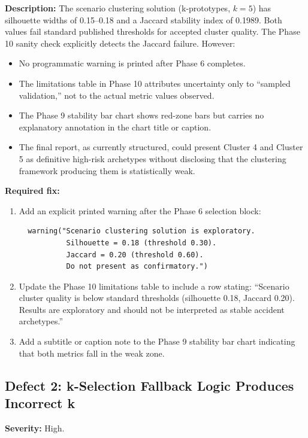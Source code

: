 \documentclass[11pt]{article}
\begin{document}
\textbf{Description:} The scenario clustering solution (k-prototypes, $k=5$)
has silhouette widths of 0.15--0.18 and a Jaccard stability index of 0.1989.
Both values fail standard published thresholds for accepted cluster quality.
The Phase 10 sanity check explicitly detects the Jaccard failure. However:

\begin{itemize}
\item No programmatic warning is printed after Phase 6 completes.
\item The limitations table in Phase 10 attributes uncertainty only to ``sampled
  validation,'' not to the actual metric values observed.
\item The Phase 9 stability bar chart shows red-zone bars but carries no
  explanatory annotation in the chart title or caption.
\item The final report, as currently structured, could present Cluster 4 and
  Cluster 5 as definitive high-risk archetypes without disclosing that the
  clustering framework producing them is statistically weak.
\end{itemize}

\textbf{Required fix:}
\begin{enumerate}
\item Add an explicit printed warning after the Phase 6 selection block:
  \begin{verbatim}
  warning("Scenario clustering solution is exploratory.
           Silhouette = 0.18 (threshold 0.30).
           Jaccard = 0.20 (threshold 0.60).
           Do not present as confirmatory.")
  \end{verbatim}
\item Update the Phase 10 limitations table to include a row stating:
  ``Scenario cluster quality is below standard thresholds
  (silhouette 0.18, Jaccard 0.20). Results are exploratory and should
  not be interpreted as stable accident archetypes.''
\item Add a subtitle or caption note to the Phase 9 stability bar chart
  indicating that both metrics fall in the weak zone.
\end{enumerate}

\subsection{Defect 2: k-Selection Fallback Logic Produces Incorrect k}

\textbf{Severity:} High.
\end{document}
